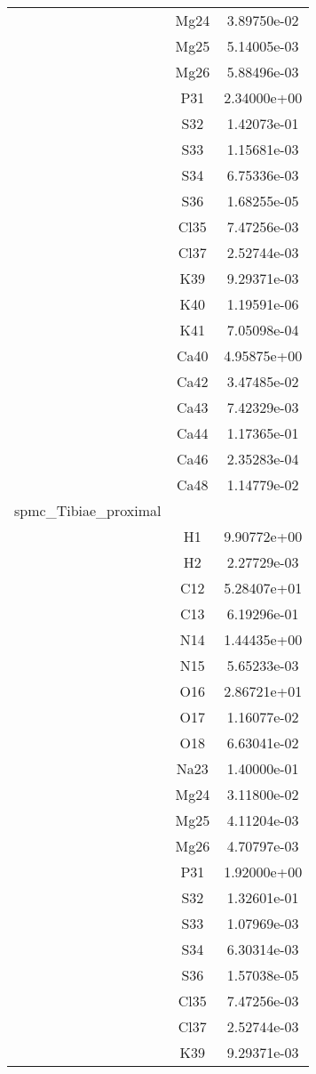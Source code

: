 \begin{centering}
\begin{longtable}{l c c}
& Mg24 & 3.89750e-02 \\ 
& Mg25 & 5.14005e-03 \\ 
& Mg26 & 5.88496e-03 \\ 
& P31 & 2.34000e+00 \\ 
& S32 & 1.42073e-01 \\ 
& S33 & 1.15681e-03 \\ 
& S34 & 6.75336e-03 \\ 
& S36 & 1.68255e-05 \\ 
& Cl35 & 7.47256e-03 \\ 
& Cl37 & 2.52744e-03 \\ 
& K39 & 9.29371e-03 \\ 
& K40 & 1.19591e-06 \\ 
& K41 & 7.05098e-04 \\ 
& Ca40 & 4.95875e+00 \\ 
& Ca42 & 3.47485e-02 \\ 
& Ca43 & 7.42329e-03 \\ 
& Ca44 & 1.17365e-01 \\ 
& Ca46 & 2.35283e-04 \\ 
& Ca48 & 1.14779e-02 \\ 
\hline
spmc\_Tibiae\_proximal & & \\
\hline
& H1 & 9.90772e+00 \\ 
& H2 & 2.27729e-03 \\ 
& C12 & 5.28407e+01 \\ 
& C13 & 6.19296e-01 \\ 
& N14 & 1.44435e+00 \\ 
& N15 & 5.65233e-03 \\ 
& O16 & 2.86721e+01 \\ 
& O17 & 1.16077e-02 \\ 
& O18 & 6.63041e-02 \\ 
& Na23 & 1.40000e-01 \\ 
& Mg24 & 3.11800e-02 \\ 
& Mg25 & 4.11204e-03 \\ 
& Mg26 & 4.70797e-03 \\ 
& P31 & 1.92000e+00 \\ 
& S32 & 1.32601e-01 \\ 
& S33 & 1.07969e-03 \\ 
& S34 & 6.30314e-03 \\ 
& S36 & 1.57038e-05 \\ 
& Cl35 & 7.47256e-03 \\ 
& Cl37 & 2.52744e-03 \\ 
& K39 & 9.29371e-03 \\ 

\end{longtable}
\end{centering}
